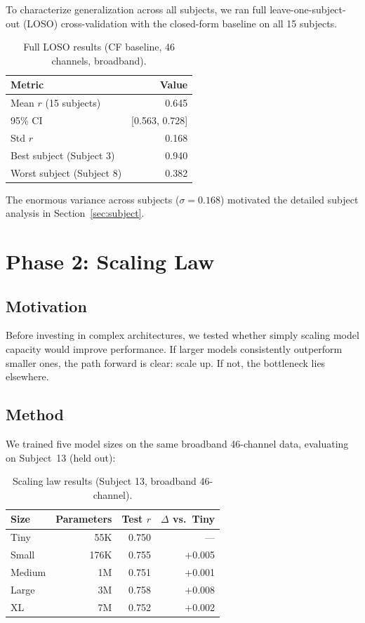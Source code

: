 \documentclass[11pt,a4paper]{article}
\begin{document}
To characterize generalization across all subjects, we ran full
leave-one-subject-out (LOSO) cross-validation with the closed-form
baseline on all 15 subjects.

\begin{table}[H]
\centering
\caption{Full LOSO results (CF baseline, 46 channels, broadband).}
\begin{tabular}{lr}
\toprule
Metric & Value \\
\midrule
Mean $r$ (15 subjects) & 0.645 \\
95\% CI & [0.563, 0.728] \\
Std $r$ & 0.168 \\
Best subject (Subject 3) & 0.940 \\
Worst subject (Subject 8) & 0.382 \\
\bottomrule
\end{tabular}
\end{table}

The enormous variance across subjects ($\sigma = 0.168$) motivated the
detailed subject analysis in Section~\ref{sec:subject}.

\section{Phase 2: Scaling Law}
\label{sec:scaling}

\subsection{Motivation}

Before investing in complex architectures, we tested whether simply
scaling model capacity would improve performance. If larger models
consistently outperform smaller ones, the path forward is clear: scale up.
If not, the bottleneck lies elsewhere.

\subsection{Method}

We trained five model sizes on the same broadband 46-channel data,
evaluating on Subject~13 (held out):

\begin{table}[H]
\centering
\caption{Scaling law results (Subject 13, broadband 46-channel).}
\begin{tabular}{lrrr}
\toprule
Size & Parameters & Test $r$ & $\Delta$ vs.\ Tiny \\
\midrule
Tiny & 55K & 0.750 & --- \\
Small & 176K & 0.755 & +0.005 \\
Medium & 1M & 0.751 & +0.001 \\
Large & 3M & 0.758 & +0.008 \\
XL & 7M & 0.752 & +0.002 \\
\bottomrule
\end{tabular}
\end{table}
\end{document}
